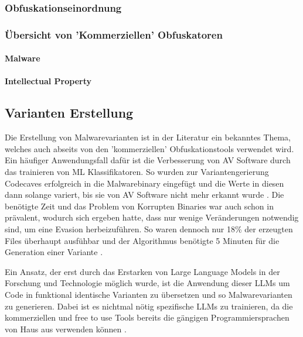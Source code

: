 \subsubsection{Obfuskationseinordnung}
\subsubsection{Übersicht von 'Kommerziellen' Obfuskatoren}
\paragraph{Malware}
\paragraph{Intellectual Property}

\subsection{Varianten Erstellung}
Die Erstellung von Malwarevarianten ist in der Literatur ein bekanntes Thema, welches auch abseits von den 'kommerziellen' Obfuskationstools verwendet wird. Ein häufiger Anwendungsfall dafür ist die Verbesserung von AV Software durch das trainieren von ML Klassifikatoren\cite{phan_2022_leveraging}. So wurden zur Variantengerierung Codecaves erfolgreich in die Malwarebinary eingefügt und die Werte in diesen dann solange variert, bis sie von AV Software nicht mehr erkannt wurde \cite{yuste_2022_optimization}. Die benötigte Zeit und das Problem von Korrupten Binaries war auch schon in \cite{castro_2019_armed} prävalent, wodurch sich ergeben hatte, dass nur wenige Veränderungen notwendig sind, um eine Evasion herbeizuführen. So waren dennoch nur 18\% der erzeugten Files überhaupt ausfühbar und der Algorithmus benötigte 5 Minuten für die Generation einer Variante \cite{castro_2019_armed}.

Ein Ansatz, der erst durch das Erstarken von Large Language Models in der Forschung und Technologie möglich wurde, ist die Anwendung dieser LLMs um Code in funktional identische Varianten zu übersetzen und so Malwarevarianten zu generieren. Dabei ist es nichtmal nötig spezifische LLMs zu trainieren, da die kommerziellen und free to use Tools bereits die  gängigen Programmiersprachen von Haus aus verwenden können \cite{madani_2023_metamorphic}.
